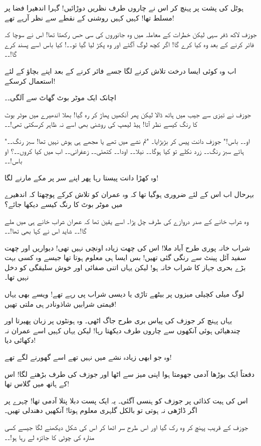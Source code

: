 ہوٹل کی پشت پر پہنچ کر اس نے چاروں طرف نظریں دوڑائیں! گہرا اندھیرا فضا پر مسلط تھا! کہیں کہیں روشنی کے نقطے سے نظر آرہے تھے!

جوزف لاکھ ڈفر سہی لیکن خطرات کے معاملہ میں وہ جانوروں کی سی حس رکھتا تھا! اس نے سوچا کہ فائر کرنے کے بعد وہ کیا کرے گا! اگر کچھ لوگ آگئے اور وہ پکڑ لیا گیا تو۔۔! کیا باس اسے پسند کرے گا!۔۔

اب وہ کوئی ایسا درخت تلاش کرنے لگا جسے فائر کرنے کے بعد اپنے بچاؤ کے لئے استعمال کرسکے!

اچانک ایک موٹر بوٹ گھاٹ سے آلگی۔۔

جوزف نے تیزی سے جیب میں ہاتھ ڈالا لیکن پھر آنکھیں پھاڑ کر رہ گیا! بھلا اندھیرے میں موٹر بوٹ کا رنگ کیسے نظر آتا! ہیڈ لیمپ کی روشنی بھی اسے نہ ظاہر کرسکتی تھی!۔۔

"او۔۔ باس!" جوزف دانت پیس کر بڑبڑایا۔ "تم نشے میں تھے یا مجھے ہی ہوش نہیں تھا! سبز رنگ۔۔ ہائے سبز رنگ۔۔ زرد نکلے تو کیا ہوگا۔۔ نیلا۔۔ اودا۔۔ کتھئی۔۔ زعفرانی۔۔ اب میں کیا کروں۔۔؟ او باس!۔۔

وہ کھڑا دانت پیستا رہا پھر اپنے سر پر مکے مارنے لگا!

بہرحال اب اس کے لئے ضروری ہوگیا تھا کہ وہ عمران کو تلاش کرکے پوچھتا کہ اندھیرے میں موٹر بوٹ کا رنگ کیسے دیکھا جائے؟

وہ شراب خانے کے صدر دروازے کی طرف چل پڑا۔ اسے یقین تھا کہ عمران شراب خانے ہی میں ملے گا!۔۔ شاید اس نے کہا بھی تھا!۔۔

شراب خانہ پوری طرح آباد ملا! اس کی چھت زیادہ اونچی نہیں تھی! دیواریں اور چھت سفید آئل پینٹ سے رنگی گئی تھیں! بس ایسا ہی معلوم ہوتا تھا جیسے وہ کسی بہت بڑے بحری جہاز کا شراب خانہ ہو! لیکن یہاں اتنی صفائی اور خوش سلیقگی کو دخل نہیں تھا۔

لوگ میلی کچیلی میزوں پر بیٹھے تاڑی یا دیسی شراب پی رہے تھے! ویسے بھی یہاں قیمتی شرابیں شاذونادر ہی ملتی تھیں!

یہاں پہنچ کر جوزف کی پیاس بری طرح جاگ اٹھی۔ وہ ہونٹوں پر زبان پھیرتا اور چندھیائی ہوئی آنکھوں سے چاروں طرف دیکھتا رہا! لیکن یہاں کہیں اسے عمران نہ دکھائی دیا!

وہ جو ابھی زیادہ نشے میں نہیں تھے اسے گھورنے لگے تھے!

دفعتاً ایک بوڑھا آدمی جھومتا ہوا اپنی میز سے اٹھا اور جوزف کی طرف بڑھنے لگا! اس کے ہاتھ میں گلاس تھا!

اس کی ہیت کذائی پر جوزف کو ہنسی آگئی۔ یہ ایک پست دبلا پتلا آدمی تھا! چہرے پر اگر ڈاڑھی نہ ہوتی تو بالکل گلہری معلوم ہوتا! آنکھیں دھندلی تھیں۔

جوزف کے قریب پہنچ کر وہ رک گیا اور اس طرح سر اٹھا کر اس کی شکل دیکھنے لگا جیسے کسی منارہ کی چوٹی کا جائزہ لے رہا ہو!۔۔

